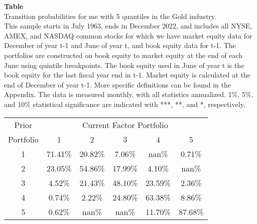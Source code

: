 \begin{table*}[ht!]
\raggedright
{}
\label{tab: transition_probs_me_Gold_with_5_quantiles}
\textbf{Table \thetable} \\
Transition probabilities for me with 5 quantiles in the Gold industry. \\
\hspace*{1em}This sample starts in July 1963, ends in December 2022, and includes all NYSE, AMEX, and NASDAQ common stocks for which we have market equity data for December of year t-1 and June of year t, and book equity data for t-1. The portfolios are constructed on book equity to market equity at the end of each June using quintile breakpoints.  The book equity used in June of year t is the book equity for the last fiscal year end in t-1.  Market equity is calculated at the end of December of year t-1.  More specific definitions can be found in the Appendix.  The data is measured monthly, with all statistics annualized.  1\%, 5\%, and 10\% statistical significance are indicated with ***, **, and *, respectively. \\
\vspace{0.5em}
\centering
\begin{adjustbox}{max width=\textwidth}
\begin{tabular}{@{}cccccc@{}}
\toprule
Prior & \multicolumn{5}{c}{Current Factor Portfolio} \\
Portfolio & 1 & 2 & 3 & 4 & 5 \\
\midrule
1 & 71.41\% & 20.82\% & 7.06\% & nan\% & 0.71\% \\
2 & 23.05\% & 54.86\% & 17.99\% & 4.10\% & nan\% \\
3 & 4.52\% & 21.43\% & 48.10\% & 23.59\% & 2.36\% \\
4 & 0.74\% & 2.22\% & 24.80\% & 63.38\% & 8.86\% \\
5 & 0.62\% & nan\% & nan\% & 11.70\% & 87.68\% \\
\bottomrule
\end{tabular}
\end{adjustbox}
\end{table*}